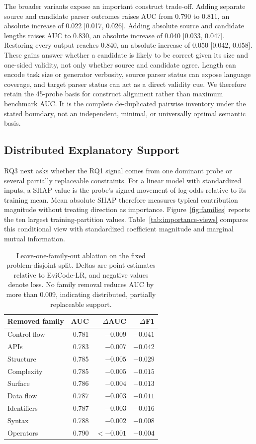 \documentclass[conference]{IEEEtran}
\begin{document}
The broader variants expose an important construct trade-off. Adding separate source and candidate parser outcomes raises AUC from 0.790 to 0.811, an absolute increase of 0.022 [0.017, 0.026]. Adding absolute source and candidate lengths raises AUC to 0.830, an absolute increase of 0.040 [0.033, 0.047]. Restoring every output reaches 0.840, an absolute increase of 0.050 [0.042, 0.058]. These gains answer whether a candidate is likely to be correct given its size and one-sided validity, not only whether source and candidate agree. Length can encode task size or generator verbosity, source parser status can expose language coverage, and target parser status can act as a direct validity cue. We therefore retain the 45-probe basis for construct alignment rather than maximum benchmark AUC. It is the complete de-duplicated pairwise inventory under the stated boundary, not an independent, minimal, or universally optimal semantic basis.

\subsection{Distributed Explanatory Support}
RQ3 next asks whether the RQ1 signal comes from one dominant probe or several partially replaceable constraints. For a linear model with standardized inputs, a SHAP value is the probe's signed movement of log-odds relative to its training mean. Mean absolute SHAP therefore measures typical contribution magnitude without treating direction as importance. Figure~\ref{fig:families} reports the ten largest training-partition values. Table~\ref{tab:importance-views} compares this conditional view with standardized coefficient magnitude and marginal mutual information.

\begin{table}[t]
\centering
\caption{Leave-one-family-out ablation on the fixed problem-disjoint split. Deltas are point estimates relative to EviCode-LR, and negative values denote loss. No family removal reduces AUC by more than 0.009, indicating distributed, partially replaceable support.}
\label{tab:ablation}
\begin{tabular}{@{}lrrr@{}}
\toprule
Removed family & AUC & $\Delta$AUC & $\Delta$F1 \\
\midrule
Control flow & 0.781 & $-0.009$ & $-0.041$ \\
APIs         & 0.783 & $-0.007$ & $-0.042$ \\
Structure    & 0.785 & $-0.005$ & $-0.029$ \\
Complexity   & 0.785 & $-0.005$ & $-0.015$ \\
Surface      & 0.786 & $-0.004$ & $-0.013$ \\
Data flow    & 0.787 & $-0.003$ & $-0.011$ \\
Identifiers  & 0.787 & $-0.003$ & $-0.016$ \\
Syntax       & 0.788 & $-0.002$ & $-0.008$ \\
Operators    & 0.790 & $<-0.001$ & $-0.004$ \\
\bottomrule
\end{tabular}
\end{table}
\end{document}
